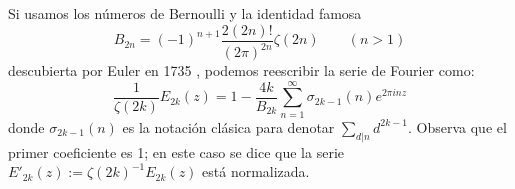 \documentclass[../../tesis_maestria]{subfiles}
\begin{document}
Si usamos los n\'umeros de Bernoulli y la identidad famosa
\[
  B_{2n}=(-1)^{n+1}\frac{2(2n)!}{(2\pi)^{2n}}\zeta(2n)\qquad (n>1)
\]
descubierta por Euler en 1735 \cite{EulerDSSR}, podemos reescribir la serie de Fourier como:
\[
  \frac{1}{\zeta(2k)}E_{2k}(z)=1-\frac{4k}{B_{2k}}\sum_{n=1}^{\infty}\sigma_{2k-1}(n)e^{2\pi inz}
\]
donde $\sigma_{2k-1}(n)$ es la notaci\'on cl\'asica para denotar $\sum_{d|n}d^{2k-1}$. Observa
que el primer coeficiente es 1; en este caso se dice que la serie $E'_{2k}(z):=\zeta(2k)^{-1}E_{2k}(z)$
est\'a normalizada.

\end{document}
